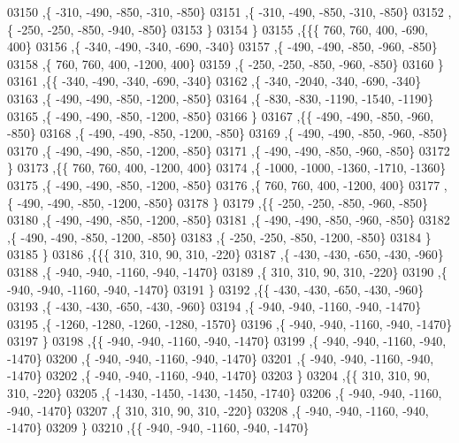\begin{DoxyCode}
03150     ,\{  -310,  -490,  -850,  -310,  -850\}
03151     ,\{  -310,  -490,  -850,  -310,  -850\}
03152     ,\{  -250,  -250,  -850,  -940,  -850\}
03153     \}
03154    \}
03155   ,\{\{\{   760,   760,   400,  -690,   400\}
03156     ,\{  -340,  -490,  -340,  -690,  -340\}
03157     ,\{  -490,  -490,  -850,  -960,  -850\}
03158     ,\{   760,   760,   400, -1200,   400\}
03159     ,\{  -250,  -250,  -850,  -960,  -850\}
03160     \}
03161    ,\{\{  -340,  -490,  -340,  -690,  -340\}
03162     ,\{  -340, -2040,  -340,  -690,  -340\}
03163     ,\{  -490,  -490,  -850, -1200,  -850\}
03164     ,\{  -830,  -830, -1190, -1540, -1190\}
03165     ,\{  -490,  -490,  -850, -1200,  -850\}
03166     \}
03167    ,\{\{  -490,  -490,  -850,  -960,  -850\}
03168     ,\{  -490,  -490,  -850, -1200,  -850\}
03169     ,\{  -490,  -490,  -850,  -960,  -850\}
03170     ,\{  -490,  -490,  -850, -1200,  -850\}
03171     ,\{  -490,  -490,  -850,  -960,  -850\}
03172     \}
03173    ,\{\{   760,   760,   400, -1200,   400\}
03174     ,\{ -1000, -1000, -1360, -1710, -1360\}
03175     ,\{  -490,  -490,  -850, -1200,  -850\}
03176     ,\{   760,   760,   400, -1200,   400\}
03177     ,\{  -490,  -490,  -850, -1200,  -850\}
03178     \}
03179    ,\{\{  -250,  -250,  -850,  -960,  -850\}
03180     ,\{  -490,  -490,  -850, -1200,  -850\}
03181     ,\{  -490,  -490,  -850,  -960,  -850\}
03182     ,\{  -490,  -490,  -850, -1200,  -850\}
03183     ,\{  -250,  -250,  -850, -1200,  -850\}
03184     \}
03185    \}
03186   ,\{\{\{   310,   310,    90,   310,  -220\}
03187     ,\{  -430,  -430,  -650,  -430,  -960\}
03188     ,\{  -940,  -940, -1160,  -940, -1470\}
03189     ,\{   310,   310,    90,   310,  -220\}
03190     ,\{  -940,  -940, -1160,  -940, -1470\}
03191     \}
03192    ,\{\{  -430,  -430,  -650,  -430,  -960\}
03193     ,\{  -430,  -430,  -650,  -430,  -960\}
03194     ,\{  -940,  -940, -1160,  -940, -1470\}
03195     ,\{ -1260, -1280, -1260, -1280, -1570\}
03196     ,\{  -940,  -940, -1160,  -940, -1470\}
03197     \}
03198    ,\{\{  -940,  -940, -1160,  -940, -1470\}
03199     ,\{  -940,  -940, -1160,  -940, -1470\}
03200     ,\{  -940,  -940, -1160,  -940, -1470\}
03201     ,\{  -940,  -940, -1160,  -940, -1470\}
03202     ,\{  -940,  -940, -1160,  -940, -1470\}
03203     \}
03204    ,\{\{   310,   310,    90,   310,  -220\}
03205     ,\{ -1430, -1450, -1430, -1450, -1740\}
03206     ,\{  -940,  -940, -1160,  -940, -1470\}
03207     ,\{   310,   310,    90,   310,  -220\}
03208     ,\{  -940,  -940, -1160,  -940, -1470\}
03209     \}
03210    ,\{\{  -940,  -940, -1160,  -940, -1470\}

\end{DoxyCode}
